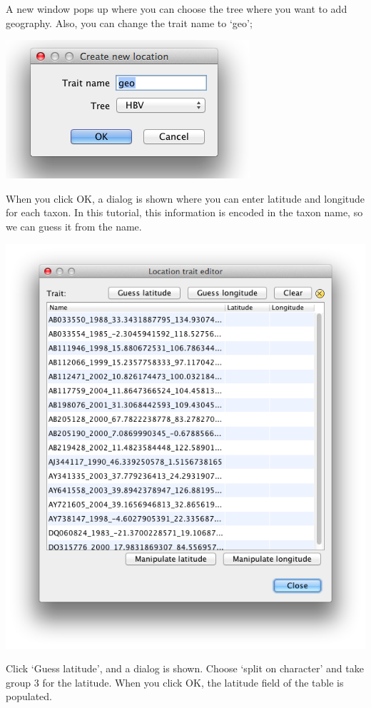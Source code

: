 \documentclass{article}
\begin{document}
A new window pops up where you can choose the tree where you want to add geography.
Also, you can change the trait name to `geo';

\includegraphics[scale=0.4]{figures/BEAUti_geography2.png}

When you click OK, a dialog is shown where you can enter latitude and longitude for each taxon.
In this tutorial, this information is encoded in the taxon name, so we can guess it from the name. 

\includegraphics[scale=0.4]{figures/BEAUti_geography3.png}

Click `Guess latitude', and a dialog is shown. Choose `split on character' and take group 3 for the latitude.
When you click OK, the latitude field of the table is populated.
\end{document}
